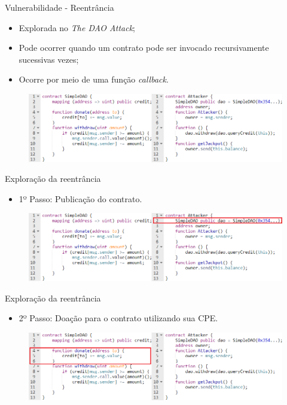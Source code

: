 \begin{frame}{Vulnerabilidade - Reentrância}
    \begin{itemize}
        \item Explorada no \textit{The DAO Attack};
        \item Pode ocorrer quando um contrato pode ser invocado recursivamente sucessivas vezes;
        \item Ocorre por meio de uma função \textit{callback}.
    \end{itemize}
    \begin{figure}[!htb]
        \centering
        \includegraphics[scale=0.45]{figuras/contratos-inteligentes/reentrancia-exemplo.png}
    \end{figure}
\end{frame}

\begin{frame}{Exploração da reentrância}
    \begin{itemize}
        \item 1º Passo: Publicação do contrato.
    \end{itemize}
    \begin{figure}[!htb]
     \centering
     \includegraphics[scale=0.45]{figuras/contratos-inteligentes/reentrancia-passo-1.png}
    \end{figure}    
\end{frame}

\begin{frame}{Exploração da reentrância}
    \begin{itemize}
        \item 2º Passo: Doação para o contrato utilizando sua CPE.
    \end{itemize}
    \begin{figure}[!htb]
     \centering
     \includegraphics[scale=0.45]{figuras/contratos-inteligentes/reentrancia-passo-2.png}
    \end{figure}     
\end{frame}

